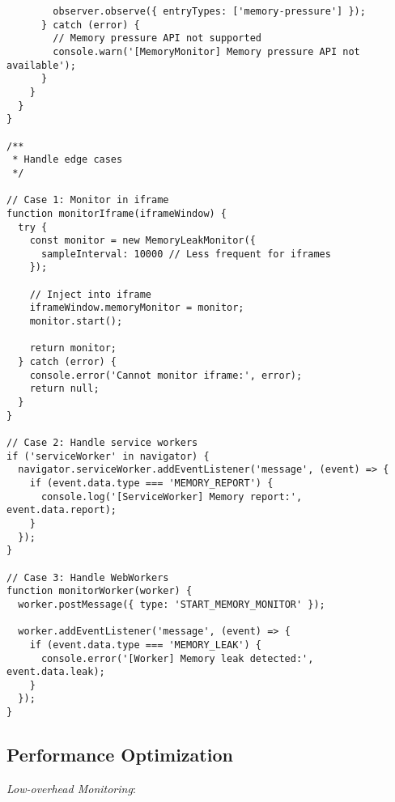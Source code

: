 \documentclass[11pt]{article}
\begin{document}
\begin{verbatim}
        observer.observe({ entryTypes: ['memory-pressure'] });
      } catch (error) {
        // Memory pressure API not supported
        console.warn('[MemoryMonitor] Memory pressure API not available');
      }
    }
  }
}

/**
 * Handle edge cases
 */

// Case 1: Monitor in iframe
function monitorIframe(iframeWindow) {
  try {
    const monitor = new MemoryLeakMonitor({
      sampleInterval: 10000 // Less frequent for iframes
    });
    
    // Inject into iframe
    iframeWindow.memoryMonitor = monitor;
    monitor.start();
    
    return monitor;
  } catch (error) {
    console.error('Cannot monitor iframe:', error);
    return null;
  }
}

// Case 2: Handle service workers
if ('serviceWorker' in navigator) {
  navigator.serviceWorker.addEventListener('message', (event) => {
    if (event.data.type === 'MEMORY_REPORT') {
      console.log('[ServiceWorker] Memory report:', event.data.report);
    }
  });
}

// Case 3: Handle WebWorkers
function monitorWorker(worker) {
  worker.postMessage({ type: 'START_MEMORY_MONITOR' });
  
  worker.addEventListener('message', (event) => {
    if (event.data.type === 'MEMORY_LEAK') {
      console.error('[Worker] Memory leak detected:', event.data.leak);
    }
  });
}
\end{verbatim}
\subsection{Performance Optimization}
\label{sec:org50eab09}

\emph{Low-overhead Monitoring}:
\end{document}
